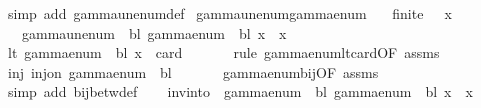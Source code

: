 \begin{isabellebody}
\ {\isacharparenleft}{\kern0pt}simp\ add{\isacharcolon}{\kern0pt}\ gamma{\isacharunderscore}{\kern0pt}unenum{\isacharunderscore}{\kern0pt}def{\isacharparenright}{\kern0pt}\isanewline
{}\isamarkupfalse%
%
\endisatagproof
{\isafoldproof}%
%
\isadelimproof
\isanewline
%
\endisadelimproof
\isanewline
{}\isamarkupfalse%
\ gamma{\isacharunderscore}{\kern0pt}unenum{\isacharunderscore}{\kern0pt}gamma{\isacharunderscore}{\kern0pt}enum{\isacharcolon}{\kern0pt}\isanewline
\ \ \ {\isachardoublequoteopen}finite\ {\isasymGamma}{\isachardoublequoteclose}\ \ {\isachardoublequoteopen}x\ {\isasymin}\ {\isasymGamma}{\isachardoublequoteclose}\isanewline
\ \ \ {\isachardoublequoteopen}gamma{\isacharunderscore}{\kern0pt}unenum\ {\isasymGamma}\ bl\ {\isacharparenleft}{\kern0pt}gamma{\isacharunderscore}{\kern0pt}enum\ {\isasymGamma}\ bl\ x{\isacharparenright}{\kern0pt}\ {\isacharequal}{\kern0pt}\ x{\isachardoublequoteclose}\isanewline
%
\isadelimproof
%
\endisadelimproof
%
\isatagproof
{}\isamarkupfalse%
\ {\isacharminus}{\kern0pt}\isanewline
\ \ \isamarkupfalse%
\ lt{\isacharcolon}{\kern0pt}\ {\isachardoublequoteopen}gamma{\isacharunderscore}{\kern0pt}enum\ {\isasymGamma}\ bl\ x\ {\isacharless}{\kern0pt}\ card\ {\isasymGamma}{\isachardoublequoteclose}\isanewline
\ \ \ \ \isamarkupfalse%
\ {\isacharparenleft}{\kern0pt}rule\ gamma{\isacharunderscore}{\kern0pt}enum{\isacharunderscore}{\kern0pt}lt{\isacharunderscore}{\kern0pt}card{\isacharbrackleft}{\kern0pt}OF\ assms{\isacharbrackright}{\kern0pt}{\isacharparenright}{\kern0pt}\isanewline
\ \ \isamarkupfalse%
\ inj{\isacharcolon}{\kern0pt}\ {\isachardoublequoteopen}inj{\isacharunderscore}{\kern0pt}on\ {\isacharparenleft}{\kern0pt}gamma{\isacharunderscore}{\kern0pt}enum\ {\isasymGamma}\ bl{\isacharparenright}{\kern0pt}\ {\isasymGamma}{\isachardoublequoteclose}\isanewline
\ \ \ \ \isamarkupfalse%
\ gamma{\isacharunderscore}{\kern0pt}enum{\isacharunderscore}{\kern0pt}bij{\isacharbrackleft}{\kern0pt}OF\ assms{\isacharparenleft}{\kern0pt}{}{\isacharparenright}{\kern0pt}{\isacharbrackright}{\kern0pt}\ \isamarkupfalse%
\ {\isacharparenleft}{\kern0pt}simp\ add{\isacharcolon}{\kern0pt}\ bij{\isacharunderscore}{\kern0pt}betw{\isacharunderscore}{\kern0pt}def{\isacharparenright}{\kern0pt}\isanewline
\ \ \isamarkupfalse%
\ {\isachardoublequoteopen}inv{\isacharunderscore}{\kern0pt}into\ {\isasymGamma}\ {\isacharparenleft}{\kern0pt}gamma{\isacharunderscore}{\kern0pt}enum\ {\isasymGamma}\ bl{\isacharparenright}{\kern0pt}\ {\isacharparenleft}{\kern0pt}gamma{\isacharunderscore}{\kern0pt}enum\ {\isasymGamma}\ bl\ x{\isacharparenright}{\kern0pt}\ {\isacharequal}{\kern0pt}\ x{\isachardoublequoteclose}\isanewline

\end{isabellebody}

